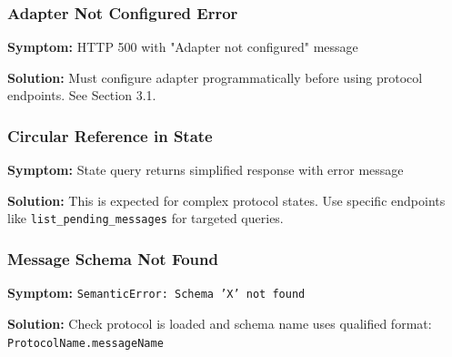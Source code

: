 \documentclass[11pt,a4paper]{article}
\begin{document}
\subsubsection{Adapter Not Configured Error}

\textbf{Symptom:} HTTP 500 with "Adapter not configured" message

\textbf{Solution:} Must configure adapter programmatically before using protocol endpoints. See Section 3.1.

\subsubsection{Circular Reference in State}

\textbf{Symptom:} State query returns simplified response with error message

\textbf{Solution:} This is expected for complex protocol states. Use specific endpoints like \texttt{list\_pending\_messages} for targeted queries.

\subsubsection{Message Schema Not Found}

\textbf{Symptom:} \texttt{SemanticError: Schema 'X' not found}

\textbf{Solution:} Check protocol is loaded and schema name uses qualified format: \texttt{ProtocolName.messageName}
\end{document}
